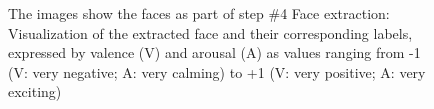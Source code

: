 \begin{figure}[htbp]
  \hfill
  \caption[ER pipeline step \#4: Face extraction]{The images show the faces as part of step \#4 Face extraction: Visualization of the extracted face and their corresponding labels, expressed by valence (V) and arousal (A) as values ranging from -1 (V: very negative; A: very calming) to +1 (V: very positive; A: very exciting)}
  \label{fig:MethodologyExtraction}
\end{figure}

